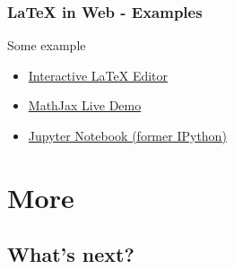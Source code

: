 \documentclass[slidestop,compress,mathserif]{beamer}
\begin{document}
		\begin{frame} \frametitle{LaTeX in Web - Examples}
			Some example\\
			
			\begin{itemize}
				\item \href{http://arachnoid.com/latex/}{Interactive LaTeX Editor}
				\item \href{https://github.com/mathjax/MathJax/blob/master/test/sample-dynamic-2.html}{MathJax Live Demo}
				\item \href{https://ipython.org/ipython-doc/3/install/install.html\#mathjax}{Jupyter Notebook (former IPython)}
			\end{itemize}
			
		\end{frame}

\section[More]{More}


\subsection[What's next?]{What's next?}
\end{document}
